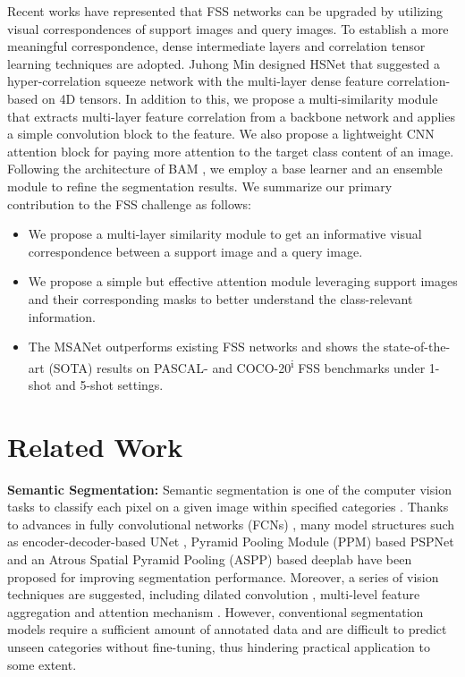 \documentclass[10pt,twocolumn,letterpaper]{article}
\begin{document}
Recent works have represented that FSS networks can be upgraded by utilizing visual correspondences \cite{visualcor} of support images and query images. To establish a more meaningful correspondence, dense intermediate layers \cite{dense1,dense2,dense3} and correlation tensor learning \cite{correspondence1,correspondence2,correspondence3} techniques are adopted. Juhong Min \etal designed HSNet \cite{FSS9Hsnet} that suggested a hyper-correlation squeeze network with the multi-layer dense feature correlation-based on 4D tensors. In addition to this, we propose a multi-similarity module that extracts multi-layer feature correlation from a backbone network and applies a simple convolution block to the feature. We also propose a lightweight CNN attention block for paying more attention to the target class content of an image. Following the architecture of BAM \cite{BAM}, we employ a base learner and an ensemble module to refine the segmentation results. We summarize our primary contribution to the FSS challenge as follows:

\begin{itemize}
    \item We propose a multi-layer similarity module to get an informative visual correspondence between a support image and a query image.  
    \item We propose a simple but effective attention module leveraging support images and their corresponding masks to better understand the class-relevant information.
    \item The MSANet outperforms existing FSS networks and shows the state-of-the-art (SOTA) results on PASCAL- \cite{FSS1shaban} and COCO-20\textsuperscript i \cite{coco20} FSS benchmarks under 1-shot and 5-shot settings.
\end{itemize}

\section{Related Work}
\label{sec:rel}
\textbf{Semantic Segmentation:} Semantic segmentation is one of the computer vision tasks to classify each pixel on a given image within specified categories \cite{sem1,sem2,sem3,sem4}. Thanks to advances in fully convolutional networks (FCNs) \cite{sem3}, many model structures such as encoder-decoder-based UNet \cite{unet}, Pyramid Pooling Module (PPM) based PSPNet \cite{PSP} and an Atrous Spatial Pyramid Pooling (ASPP) based deeplab \cite{deeplab} have been proposed for improving segmentation performance. Moreover, a series of vision techniques are suggested, including dilated convolution \cite{dilated}, multi-level feature aggregation \cite{multipath} and attention mechanism \cite{sem-attention}. However, conventional segmentation models require a sufficient amount of annotated data and are difficult to predict unseen categories without fine-tuning, thus hindering practical application to some extent. 
\end{document}
